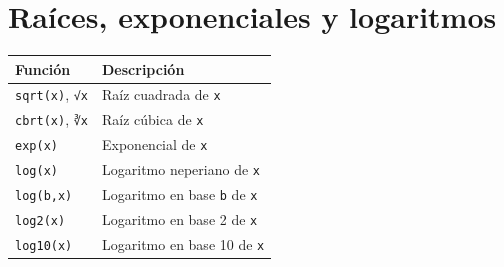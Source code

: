 \documentclass[
  a4paper,
]{scrreport}
\theoremstyle{definition}
\theoremstyle{remark}
\begin{document}
\section{Raíces, exponenciales y
logaritmos}\label{rauxedces-exponenciales-y-logaritmos}

\begin{longtable}[]{@{}
  >{\raggedright\arraybackslash}p{}
  >{\raggedright\arraybackslash}p{}@{}}
\toprule\noalign{}
\begin{minipage}[b]{\linewidth}\raggedright
Función
\end{minipage} & \begin{minipage}[b]{\linewidth}\raggedright
Descripción
\end{minipage} \\
\midrule\noalign{}
\endhead
\bottomrule\noalign{}
\endlastfoot
\texttt{sqrt(x)}, \texttt{√x} & Raíz cuadrada de \texttt{x} \\
\texttt{cbrt(x)}, \texttt{∛x} & Raíz cúbica de \texttt{x} \\
\texttt{exp(x)} & Exponencial de \texttt{x} \\
\texttt{log(x)} & Logaritmo neperiano de \texttt{x} \\
\texttt{log(b,x)} & Logaritmo en base \texttt{b} de \texttt{x} \\
\texttt{log2(x)} & Logaritmo en base 2 de \texttt{x} \\
\texttt{log10(x)} & Logaritmo en base 10 de \texttt{x} \\
\end{longtable}
\end{document}
